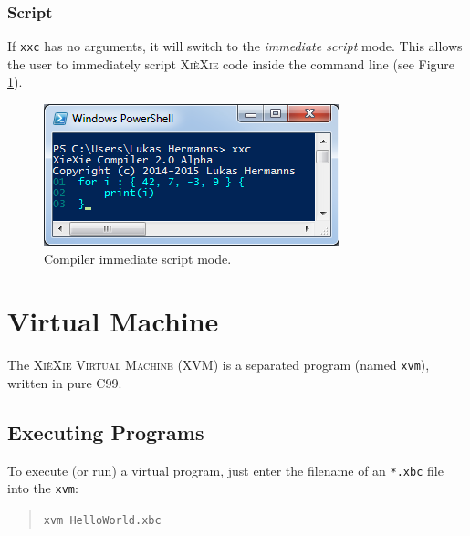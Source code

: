 \documentclass[a5paper]{report}
\def\xiexie{\textsc{Xi\`eXie}\xspace}
\def\xxc{\texttt{xxc}\xspace}
\def\xvm{\texttt{xvm}\xspace}
\begin{document}
\subsection{Script}

If \xxc has no arguments, it will switch to the \textit{immediate script} mode. This allows the user to immediately
script \xiexie code inside the command line (see Figure \ref{fig:compiler-script}).
\begin{figure}[ht]
	\centering
	\includegraphics[width=0.45 \textwidth]{images/compiler-script-win32}
	\caption{Compiler immediate script mode.}
	\label{fig:compiler-script}
\end{figure}



\chapter{Virtual Machine}

The \textsc{\xiexie Virtual Machine} (XVM) is a separated program (named \xvm), written in pure C99.



\section{Executing Programs}

To execute (or run) a virtual program, just enter the filename of an \texttt{*.xbc} file into the \xvm:
\begin{quote}
\texttt{xvm HelloWorld.xbc}
\end{quote}


\end{document}
